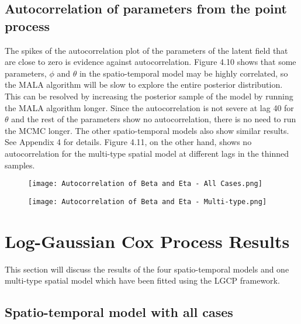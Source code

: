\documentclass[a4paper]{thesis}
\begin{document}
\subsection{Autocorrelation of parameters from the point process}

The spikes of the autocorrelation plot of the parameters of the latent field that are close to zero is evidence against autocorrelation. Figure 4.10 shows that some parameters, $\phi$ and $\theta$ in the spatio-temporal model may be highly correlated, so the MALA algorithm will be slow to explore the entire posterior
distribution. This can be resolved by increasing the posterior sample of the model by running the MALA algorithm longer. Since the autocorrelation is not severe at lag 40 for $\theta$ and the rest of the parameters show no autocorrelation, there is no need to run the MCMC longer. The other spatio-temporal models also show similar results. See Appendix 4 for  details. Figure 4.11, on the other hand, shows no autocorrelation for the multi-type spatial model at different lags in the thinned samples.

\begin{figure}[h]
\begin{center}
\texttt{[image: Autocorrelation of Beta and Eta - All Cases.png]}
\end{center} 
\end{figure}

\begin{figure}[h]
\begin{center}
\texttt{[image: Autocorrelation of Beta and Eta - Multi-type.png]}
\end{center}
\end{figure}

\section{Log-Gaussian Cox Process Results}

This section will discuss the results of the four spatio-temporal models and one multi-type spatial model which have been fitted using the LGCP framework.

\subsection{Spatio-temporal model with all cases}
\end{document}
